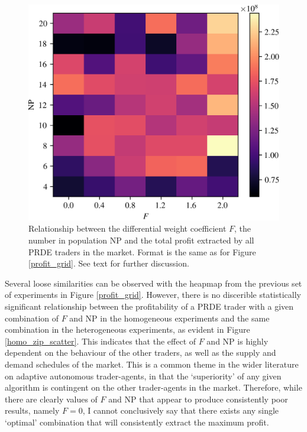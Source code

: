 \documentclass[conference]{IEEEtran}
\begin{document}
\begin{figure}[htbp]
    \centerline{\includegraphics[width=\columnwidth]{zip_profit_grid.png}}
    \caption{
        Relationship between the differential weight coefficient $F$, the number in population $\mathrm{NP}$ and the total profit extracted by all PRDE traders in the market.
        Format is the same as for Figure \ref{profit_grid}.
        See text for further discussion.
    }
    \label{zip_profit_grid}
\end{figure}

Several loose similarities can be observed with the heapmap from the previous set of experiments in Figure \ref{profit_grid}.
However, there is no discerible statistically significant relationship between the profitability of a PRDE trader with a given combination of $F$ and $\mathrm{NP}$ in the homogeneous experiments and the same combination in the heterogeneous experiments, as evident in Figure \ref{homo_zip_scatter}.
This indicates that the effect of $F$ and $\mathrm{NP}$ is highly dependent on the behaviour of the other traders, as well as the supply and demand schedules of the market.
This is a common theme in the wider literature on adaptive autonomous trader-agents, in that the `superiority' of any given algorithm is contingent on the other trader-agents in the market.
Therefore, while there are clearly values of $F$ and $\mathrm{NP}$ that appear to produce consistently poor results, namely $F=0$, I cannot conclusively say that there exists any single `optimal' combination that will consistently extract the maximum profit.
\end{document}
